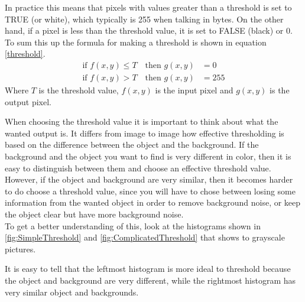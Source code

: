 In practice this means that pixels with values greater than a threshold is set to TRUE (or white), which typically is 255 when talking in bytes. On the other hand, if a pixel is less than the threshold value, it is set to FALSE (black) or 0. To sum this up the formula for making a threshold is shown in equation \ref{threshold}.
\begin{equation}
  \begin{aligned}
  	\text{if } f(x,y)\leq T \quad \text{then } g(x,y)&= 0 \\
  	\text{if } f(x,y)>T \quad \text{then } g(x,y)&= 255
	\label{threshold}  
  \end{aligned} 
\end{equation}
Where $T$ is the threshold value, $f(x,y)$ is the input pixel and $g(x,y)$ is the output pixel. 

When choosing the threshold value it is important to think about what the wanted output is. It differs  from image to image how effective thresholding is based on the difference between the object and the background. If the background and the object you want to find is very different in color, then it is easy to distinguish between them and choose an effective threshold value. However, if the object and background are very similar, then it becomes harder to do choose a threshold value, since you will have to chose between losing some information from the wanted object in order to remove background noise, or keep the object clear but have more background noise. \\
To get a better understanding of this, look at the histograms shown in \eqref{fig:SimpleThreshold} and \eqref{fig:ComplicatedThreshold} that shows to grayscale pictures.

It is easy to tell that the leftmost histogram is more ideal to threshold because the object and background are very different, while the rightmost histogram has very similar object and backgrounds.

